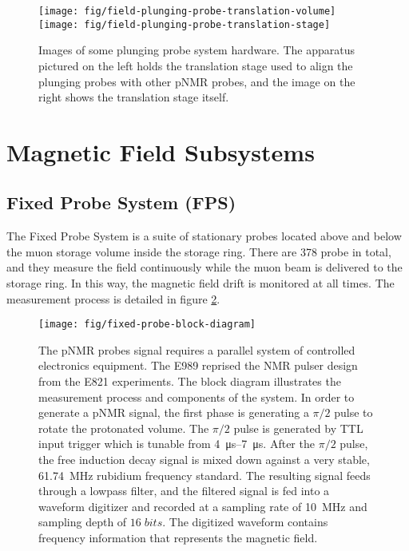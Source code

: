 \begin{figure}
\label{fig:field-plunging-probe-translation-stage}
\centering
\texttt{[image: fig/field-plunging-probe-translation-volume]}
\texttt{[image: fig/field-plunging-probe-translation-stage]}
\caption{Images of some plunging probe system hardware.  The apparatus pictured on the left holds the translation stage used to align the plunging probes with other pNMR probes, and the image on the right shows the translation stage itself.}
\end{figure}

\section{Magnetic Field Subsystems} \label{sec:field-subsystems}

\subsection{Fixed Probe System (FPS)}

The Fixed Probe System is a suite of stationary probes located above and below the muon storage volume inside the storage ring.  There are 378 probe in total, and they measure the field continuously while the muon beam is delivered to the storage ring.  In this way, the magnetic field drift is monitored at all times.  The measurement process is detailed in figure \ref{fig:fixed-probe-block-diagram}.

\begin{figure}
\label{fig:fixed-probe-block-diagram}
\centering
\texttt{[image: fig/fixed-probe-block-diagram]}
\caption{The pNMR probes signal requires a parallel system of controlled electronics equipment.  The E989 reprised the NMR pulser design from the E821 experiments. The block diagram illustrates the measurement process and components of the system.  In order to generate a pNMR signal, the first phase is generating a $\pi/2$ pulse to rotate the protonated volume.  The $\pi/2$ pulse is generated by TTL input trigger which is tunable from \SIrange{4}{7}{\micro\second}.  After the $\pi/2$ pulse, the free induction decay signal is mixed down against a very stable, \SI{61.74}{\MHz} rubidium frequency standard.  The resulting signal feeds through a lowpass filter, and the filtered signal is fed into a waveform digitizer and recorded at a sampling rate of \SI{10}{\MHz} and sampling depth of $16\;bits$.  The digitized waveform contains frequency information that represents the magnetic field.}
\end{figure}


